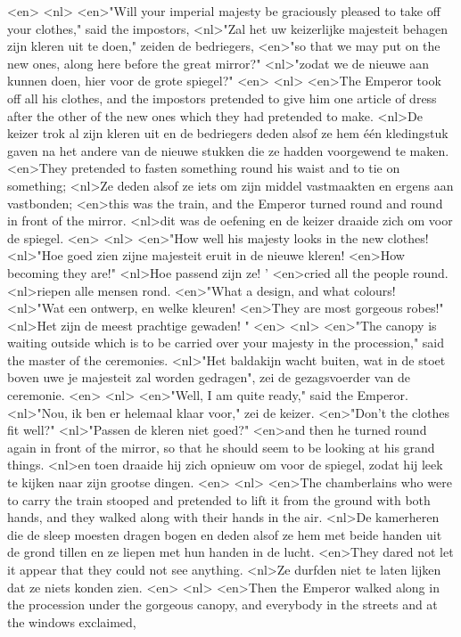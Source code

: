 <en>
<nl>
<en>"Will your imperial majesty be graciously pleased to take off your clothes," said the impostors,
<nl>"Zal het uw keizerlijke majesteit behagen zijn kleren uit te doen," zeiden de bedriegers,
<en>"so that we may put on the new ones, along here before the great mirror?"
<nl>"zodat we de nieuwe aan kunnen doen, hier voor de grote spiegel?"
<en>
<nl>
<en>The Emperor took off all his clothes, and the impostors pretended to give him one article of dress after the other of the new ones which they had pretended to make.
<nl>De keizer trok al zijn kleren uit en de bedriegers deden alsof ze hem één kledingstuk gaven na het andere van de nieuwe stukken die ze hadden voorgewend te maken.
<en>They pretended to fasten something round his waist and to tie on something;
<nl>Ze deden alsof ze iets om zijn middel vastmaakten en ergens aan vastbonden;
<en>this was the train, and the Emperor turned round and round in front of the mirror.
<nl>dit was de oefening en de keizer draaide zich om voor de spiegel.
<en>
<nl>
<en>"How well his majesty looks in the new clothes!
<nl>"Hoe goed zien zijne majesteit eruit in de nieuwe kleren!
<en>How becoming they are!"
<nl>Hoe passend zijn ze! '
<en>cried all the people round.
<nl>riepen alle mensen rond.
<en>"What a design, and what colours!
<nl>"Wat een ontwerp, en welke kleuren!
<en>They are most gorgeous robes!"
<nl>Het zijn de meest prachtige gewaden! "
<en>
<nl>
<en>"The canopy is waiting outside which is to be carried over your majesty in the procession," said the master of the ceremonies.
<nl>"Het baldakijn wacht buiten, wat in de stoet boven uwe je majesteit zal worden gedragen", zei de gezagsvoerder van de ceremonie.
<en>
<nl>
<en>"Well, I am quite ready," said the Emperor.
<nl>"Nou, ik ben er helemaal klaar voor," zei de keizer.
<en>"Don't the clothes fit well?"
<nl>"Passen de kleren niet goed?"
<en>and then he turned round again in front of the mirror, so that he should seem to be looking at his grand things.
<nl>en toen draaide hij zich opnieuw om voor de spiegel, zodat hij leek te kijken naar zijn grootse dingen.
<en>
<nl>
<en>The chamberlains who were to carry the train stooped and pretended to lift it from the ground with both hands, and they walked along with their hands in the air.
<nl>De kamerheren die de sleep moesten dragen bogen en deden alsof ze hem met beide handen uit de grond tillen en ze liepen met hun handen in de lucht.
<en>They dared not let it appear that they could not see anything.
<nl>Ze durfden niet te laten lijken dat ze niets konden zien.
<en>
<nl>
<en>Then the Emperor walked along in the procession under the gorgeous canopy, and everybody in the streets and at the windows exclaimed,
